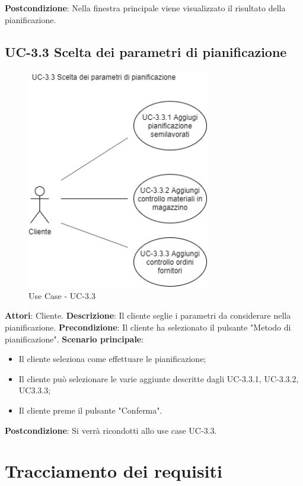 \textbf{Postcondizione}: Nella finestra principale viene visualizzato il risultato della pianificazione.


\subsection*{UC-3.3 Scelta dei parametri di pianificazione}

\begin{figure}[H]
	\includegraphics[width=8cm]{immagini/UC2.png}
	\centering
	\caption{Use Case - UC-3.3}
\end{figure}

\textbf{Attori}: Cliente. \newline
\textbf{Descrizione}: Il cliente seglie i parametri da considerare nella pianificazione.\newline
\textbf{Precondizione}: Il cliente ha selezionato il pulsante "Metodo di pianificazione".\newline
\textbf{Scenario principale}: \begin{itemize}
    \item Il cliente seleziona come effettuare le pianificazione;
    \item Il cliente può selezionare le varie aggiunte descritte dagli UC-3.3.1, UC-3.3.2, UC3.3.3;
    \item Il cliente preme il pulsante "Conferma".
\end{itemize}
\textbf{Postcondizione}: Si verrà ricondotti allo use case UC-3.3.

\section{Tracciamento dei requisiti}

